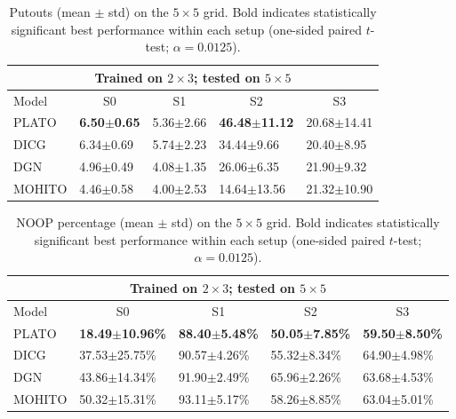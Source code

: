 \begin{table}[t]
\centering
\small
\setlength{\tabcolsep}{2.5pt}
\renewcommand{\arraystretch}{1.03}
\begin{tabular}{l|l|l|l|l}
\toprule
\multicolumn{5}{c}{Trained on $2\times 3$; tested on $5\times 5$} \\
\midrule
Model & \multicolumn{1}{c|}{S0} & \multicolumn{1}{c|}{S1} & \multicolumn{1}{c|}{S2} & \multicolumn{1}{c}{S3} \\
\midrule
PLATO & \textbf{6.50$\pm$0.65} & 5.36$\pm$2.66 & \textbf{46.48$\pm$11.12} & 20.68$\pm$14.41 \\
DICG & 6.34$\pm$0.69 & 5.74$\pm$2.23 & 34.44$\pm$9.66 & 20.40$\pm$8.95 \\
DGN & 4.96$\pm$0.49 & 4.08$\pm$1.35 & 26.06$\pm$6.35 & 21.90$\pm$9.32 \\
MOHITO  & 4.46$\pm$0.58 & 4.00$\pm$2.53 & 14.64$\pm$13.56 & 21.32$\pm$10.90 \\
\bottomrule
\end{tabular}
\caption{Putouts (mean $\pm$ std) on the $5\times 5$ grid. Bold indicates statistically significant best performance within each setup (one-sided paired $t$-test; $\alpha=0.0125$).}
\label{tab:zs_putouts_5x5}
\end{table}



\begin{table}[t]
\centering
\small
\setlength{\tabcolsep}{2.5pt}
\renewcommand{\arraystretch}{1.03}
\begin{tabular}{l|l|l|l|l}
\toprule
\multicolumn{5}{c}{Trained on $2\times 3$; tested on $5\times 5$} \\
\midrule
Model & \multicolumn{1}{c|}{S0} & \multicolumn{1}{c|}{S1} & \multicolumn{1}{c|}{S2} & \multicolumn{1}{c}{S3} \\
\midrule
PLATO & \textbf{18.49$\pm$10.96\%} & \textbf{88.40$\pm$5.48\%} & \textbf{50.05$\pm$7.85\%} & \textbf{59.50$\pm$8.50\%} \\
DICG & 37.53$\pm$25.75\% & 90.57$\pm$4.26\% & 55.32$\pm$8.34\% & 64.90$\pm$4.98\% \\
DGN & 43.86$\pm$14.34\% & 91.90$\pm$2.49\% & 65.96$\pm$2.26\% & 63.68$\pm$4.53\% \\
MOHITO  & 50.32$\pm$15.31\% & 93.11$\pm$5.17\% & 58.26$\pm$8.85\% & 63.04$\pm$5.01\% \\
\bottomrule
\end{tabular}
\caption{NOOP percentage (mean $\pm$ std) on the $5\times 5$ grid. Bold indicates statistically significant best performance within each setup (one-sided paired $t$-test; $\alpha=0.0125$).}
\label{tab:zs_noop_5x5}
\end{table}





